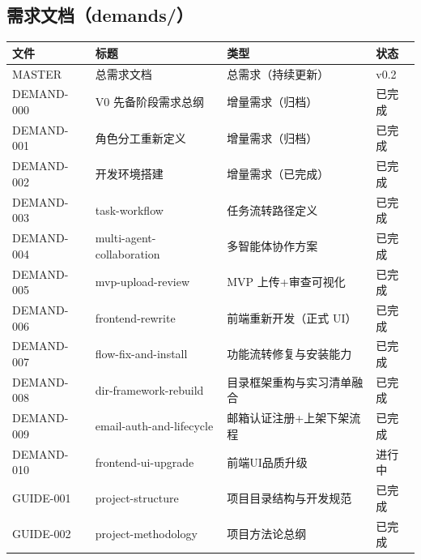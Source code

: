 \documentclass[11pt,a4paper]{article}
\begin{document}
\subsection{需求文档（demands/）}

\begin{table}[h]
\centering
\begin{tabular}{llll}
\toprule
\textbf{文件} & \textbf{标题} & \textbf{类型} & \textbf{状态} \\
\midrule
MASTER & 总需求文档 & 总需求（持续更新） & v0.2 \\
DEMAND-000 & V0 先备阶段需求总纲 & 增量需求（归档） & 已完成 \\
DEMAND-001 & 角色分工重新定义 & 增量需求（归档） & 已完成 \\
DEMAND-002 & 开发环境搭建 & 增量需求（已完成） & 已完成 \\
DEMAND-003 & task-workflow & 任务流转路径定义 & 已完成 \\
DEMAND-004 & multi-agent-collaboration & 多智能体协作方案 & 已完成 \\
DEMAND-005 & mvp-upload-review & MVP 上传+审查可视化 & 已完成 \\
DEMAND-006 & frontend-rewrite & 前端重新开发（正式 UI） & 已完成 \\
DEMAND-007 & flow-fix-and-install & 功能流转修复与安装能力 & 已完成 \\
DEMAND-008 & dir-framework-rebuild & 目录框架重构与实习清单融合 & 已完成 \\
DEMAND-009 & email-auth-and-lifecycle & 邮箱认证注册+上架下架流程 & 已完成 \\
DEMAND-010 & frontend-ui-upgrade & 前端UI品质升级 & 进行中 \\
GUIDE-001 & project-structure & 项目目录结构与开发规范 & 已完成 \\
GUIDE-002 & project-methodology & 项目方法论总纲 & 已完成 \\
\bottomrule
\end{tabular}
\end{table}
\end{document}
